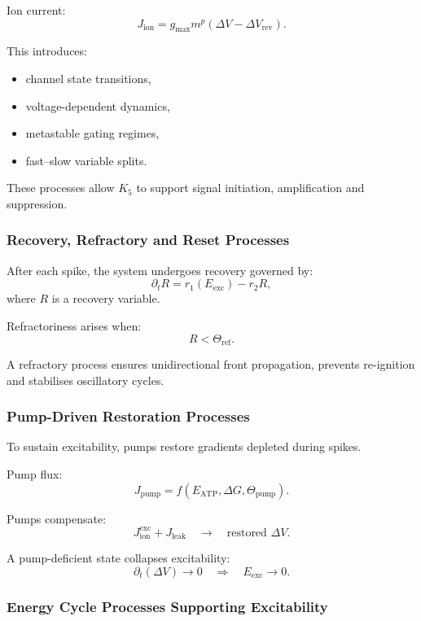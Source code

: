 Ion current:
\[
J_{\text{ion}} = g_{\text{max}} m^p (\Delta V - \Delta V_{\text{rev}}).
\]

This introduces:
\begin{itemize}
    \item channel state transitions,
    \item voltage-dependent dynamics,
    \item metastable gating regimes,
    \item fast–slow variable splits.
\end{itemize}

These processes allow $K_5$ to support signal initiation,
amplification and suppression.

\subsubsection{Recovery, Refractory and Reset Processes}

After each spike, the system undergoes recovery governed by:
\[
\partial_t R = r_1(E_{\text{exc}}) - r_2 R,
\]
where $R$ is a recovery variable.

Refractoriness arises when:
\[
R < \Theta_{\text{ref}}.
\]

A refractory process ensures unidirectional front propagation,
prevents re-ignition and stabilises oscillatory cycles.

\subsubsection{Pump-Driven Restoration Processes}

To sustain excitability, pumps restore gradients depleted during spikes.

Pump flux:
\[
J_{\text{pump}} = f(E_{\text{ATP}}, \Delta G, \Theta_{\text{pump}}).
\]

Pumps compensate:
\[
J_{\text{ion}}^{\text{exc}} + J_{\text{leak}}
\quad\longrightarrow\quad
\text{restored }\Delta V.
\]

A pump-deficient state collapses excitability:
\[
\partial_t (\Delta V) \to 0
\quad\Rightarrow\quad
E_{\text{exc}} \to 0.
\]

\subsubsection{Energy Cycle Processes Supporting Excitability}

